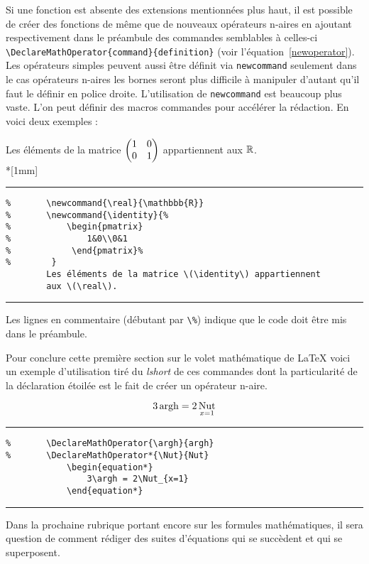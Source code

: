 	Si une fonction est absente des extensions mentionnées plus haut, il est possible de créer des fonctions de même que de nouveaux opérateurs n-aires en ajoutant respectivement dans le préambule des commandes semblables à celles-ci \verb|\DeclareMathOperator{command}{definition}| (voir l'équation~\ref{newoperator}). Les opérateurs simples peuvent aussi être définit via \verb|newcommand| seulement dans le cas opérateurs n-aires les bornes seront plus difficile à manipuler d'autant qu'il faut le définir en police droite. L'utilisation de \verb|newcommand| est beaucoup plus vaste. L'on peut définir des macros commandes pour accélérer la rédaction. En voici deux exemples :
	\begin{table}[H]
		Les éléments de la matrice \(\begin{pmatrix}1&0\\0&1\end{pmatrix}\) appartiennent aux \(\mathbb{R}\).\\*[1mm]
		\hrule
		\begin{verbatim}
%		\newcommand{\real}{\mathbbb{R}}
%		\newcommand{\identity}{%
%			\begin{pmatrix}
%			    1&0\\0&1
%			 \end{pmatrix}%
%		 }
		Les éléments de la matrice \(\identity\) appartiennent 
		aux \(\real\).
		\end{verbatim}
		\hrule
	\end{table}
	Les lignes en commentaire (débutant par \verb|\%|) indique que le code doit être mis dans le préambule.
%
	\par Pour conclure cette première section sur le volet mathématique de \LaTeX{} voici un exemple d'utilisation tiré du \textit{lshort} de ces commandes dont la particularité de la déclaration étoilée est le fait de créer un opérateur n-aire. 
%	
	\begin{table}[H]
		\begin{equation}\label{newoperator}
		3\operatorname{argh} = 2\operatorname*{Nut}_{x=1}
		\end{equation}
		\hrule
		\begin{verbatim}
%		\DeclareMathOperator{\argh}{argh}
%		\DeclareMathOperator*{\Nut}{Nut}
			\begin{equation*}
			    3\argh = 2\Nut_{x=1}
			\end{equation*}
		\end{verbatim}
		\hrule
	\end{table}
%
Dans la prochaine rubrique portant encore sur les formules mathématiques, il sera question de comment rédiger des suites d'équations qui se succèdent et qui se superposent.